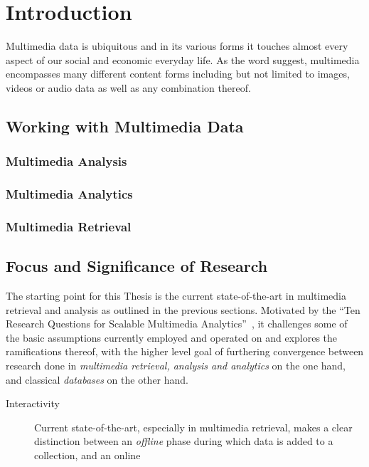 \chapter{Introduction}


Multimedia data is ubiquitous and in its various forms it touches almost every aspect of our social and economic everyday life. As the word suggest, multimedia encompasses many different content forms including but not limited to images, videos or audio data as well as any combination thereof. 


\section{Working with Multimedia Data}

\subsection{Multimedia Analysis}

\subsection{Multimedia Analytics}

\subsection{Multimedia Retrieval}

\section{Focus and Significance of Research}

The starting point for this Thesis is the current state-of-the-art in multimedia retrieval and analysis as outlined in the previous sections. Motivated by the ``Ten Research Questions for Scalable Multimedia Analytics''~\cite{Jonson:2016}, it challenges some of the basic assumptions currently employed and operated on and explores the ramifications thereof, with the higher level goal of furthering convergence between research done in \emph{multimedia retrieval, analysis and analytics} on the one hand, and classical \emph{databases} on the other hand.

\begin{description}
    \item[Interactivity] Current state-of-the-art, especially in multimedia retrieval, makes a clear distinction between an \emph{offline} phase during which data is added to a collection, and an online 
\end{description}



